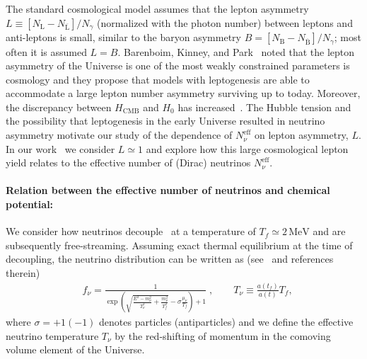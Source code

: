 The standard cosmological model assumes that the lepton asymmetry $L\equiv  [N_\mathrm{L}-N_{\overline{\mathrm{L}}}] /N_\gamma $  (normalized with the photon number) 
between leptons and anti-leptons is small, similar to the baryon asymmetry $B=[N_\mathrm{B}-N_{\overline{\mathrm{B}}}]/N_\gamma $; most often it is assumed $L=B$. Barenboim, Kinney, and Park~\cite{Barenboim:2016shh,Barenboim:2017dfq} noted that the lepton asymmetry of the Universe is one of the most weakly constrained parameters is cosmology and they propose that models with leptogenesis are able to accommodate a large lepton number asymmetry surviving up to today.  Moreover, the discrepancy between $H_\mathrm{CMB}$ and $H_0$ has increased~\cite{riess2018new,Riess:2018byc,Planck:2018vyg}. The Hubble tension and the possibility that leptogenesis in the early Universe resulted in neutrino asymmetry motivate our study of the dependence of $N_\nu^{\mathrm{eff}}$ on lepton asymmetry, $L$. In our work~\cite{Yang:2018oqg} we consider $L\simeq 1$ and explore how this large cosmological lepton yield relates to the effective number of (Dirac) neutrinos $N^{\mathrm{eff}}_\nu$. 

\paragraph{Relation between the effective number of neutrinos and chemical potential:} We consider how neutrinos decouple~\cite{Birrell:2014gea} at a temperature of $T_f\simeq 2\,\mathrm{MeV}$ and are subsequently free-streaming. Assuming exact thermal equilibrium at the time of decoupling, the neutrino distribution can be   written as (see~\cite{Birrell:2012gg} and references therein)
\begin{align}
\label{fnudef}
&f_\nu=\frac{1}{\exp{\left(\sqrt{\frac{E^2-m_\nu^2}{T_\nu^2}+\frac{m^2_\nu}{T^2_f}}-\sigma\frac{\mu_\nu}{T_f}\right)+1}}\;,\qquad T_\nu\equiv\frac{a(t_f)}{a(t)}T_f,
\end{align}
where $\sigma=+1(-1)$ denotes particles (antiparticles) and we define the effective neutrino temperature $T_\nu$  by the red-shifting of momentum in the comoving volume element of the Universe.

